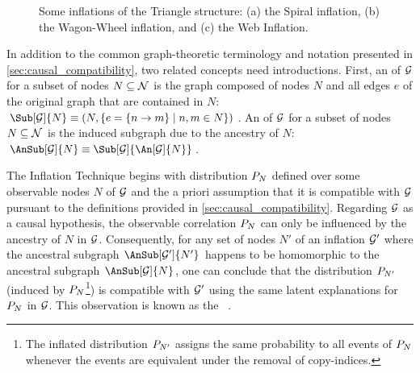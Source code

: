 \documentclass[aps, 10pt, english, twoside, pra, nofootinbib, tightenlines, longbibliography, superscriptaddress]{revtex4-1}
\begin{document}
\begin{nscenter}
\begin{figure}
\begin{subfigure}[b]{.30\linewidth}
    \caption{}
    \label{fig:the_web_inflation}
    \end{subfigure}
    \caption{Some inflations of the Triangle structure: (a) the Spiral inflation, (b) the Wagon-Wheel inflation, and (c) the Web Inflation.}
    \label{fig:inflations}
    \end{figure}
    \end{nscenter}

    In addition to the common graph-theoretic terminology and notation presented in \cref{sec:causal_compatibility}, two related concepts need introductions. First, an  of $\mathcal{G}$ for a subset of nodes $N \subseteq \mathcal{N}$ is the graph composed of nodes $N$ and all edges $e$ of the original graph that are contained in $N$: $\Sub[\graph]{N} \defined \br{N, \bc{e = \bc{n \to m} \mid n, m \in N}}$. An  of $\mathcal{G}$ for a subset of nodes $N \subseteq \mathcal{N}$ is the induced subgraph due to the ancestry of $N$: $\AnSub[\graph]{N} \defined \Sub[\graph]{\An[\graph]{N}}$.

    The Inflation Technique begins with distribution $\prob[N]$ defined over some observable nodes $N$ of $\mathcal{G}$ and the a priori assumption that it is compatible with $\mathcal{G}$ pursuant to the definitions provided in \cref{sec:causal_compatibility}. Regarding $\mathcal{G}$ as a causal hypothesis, the observable correlation $\prob[N]$ can only be influenced by the ancestry of $N$ in $\mathcal{G}$. Consequently, for any set of nodes $N'$ of an inflation $\mathcal{G}'$ where the ancestral subgraph $\AnSub[\graph']{N'}$ happens to be homomorphic to the ancestral subgraph $\AnSub[\graph]{N}$, one can conclude that the distribution $\prob[N']$ (induced by $\prob[N]$\footnote{The inflated distribution $\prob[N']$ assigns the same probability to all events of $\prob[N]$ whenever the events are equivalent under the removal of copy-indices.}) is compatible with $\mathcal{G}'$ using the same latent explanations for $\prob[N]$ in $\mathcal{G}$. This observation is known as the ~\cite[Lemma 3]{Inflation}.
\end{document}
